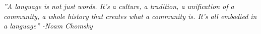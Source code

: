\phantom{~}
\vspace{40mm}
\begin{flushright}
	{\em ''A language is not just words. It’s a culture, a tradition, a unification of a community, a whole history that creates what a community is. It’s all embodied in a language'' \newline \newline \newline \bigskip
	-Noam Chomsky\newline \bigskip

	}
\end{flushright}

\newpage
\phantom{~}
\newpage